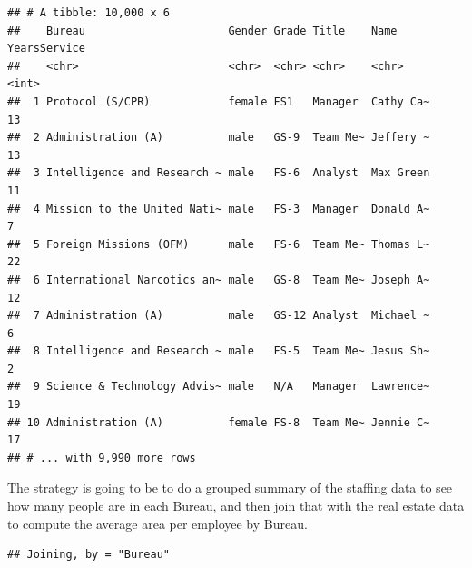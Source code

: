 \documentclass[12pt,letterpaperpaper,openany]{book}
\newenvironment{Shaded}{\begin{snugshade}}{\end{snugshade}}
\newcommand{\DataTypeTok}[1]{\textcolor[rgb]{0.13,0.29,0.53}{#1}}
\newcommand{\KeywordTok}[1]{\textcolor[rgb]{0.13,0.29,0.53}{\textbf{#1}}}
\newcommand{\NormalTok}[1]{#1}
\newcommand{\OperatorTok}[1]{\textcolor[rgb]{0.81,0.36,0.00}{\textbf{#1}}}
\newcommand{\StringTok}[1]{\textcolor[rgb]{0.31,0.60,0.02}{#1}}
\begin{document}
\begin{verbatim}
## # A tibble: 10,000 x 6
##    Bureau                      Gender Grade Title    Name      YearsService
##    <chr>                       <chr>  <chr> <chr>    <chr>            <int>
##  1 Protocol (S/CPR)            female FS1   Manager  Cathy Ca~           13
##  2 Administration (A)          male   GS-9  Team Me~ Jeffery ~           13
##  3 Intelligence and Research ~ male   FS-6  Analyst  Max Green           11
##  4 Mission to the United Nati~ male   FS-3  Manager  Donald A~            7
##  5 Foreign Missions (OFM)      male   FS-6  Team Me~ Thomas L~           22
##  6 International Narcotics an~ male   GS-8  Team Me~ Joseph A~           12
##  7 Administration (A)          male   GS-12 Analyst  Michael ~            6
##  8 Intelligence and Research ~ male   FS-5  Team Me~ Jesus Sh~            2
##  9 Science & Technology Advis~ male   N/A   Manager  Lawrence~           19
## 10 Administration (A)          female FS-8  Team Me~ Jennie C~           17
## # ... with 9,990 more rows
\end{verbatim}

The strategy is going to be to do a grouped summary of the staffing data to see how
many people are in each Bureau, and then join that with the real estate data to
compute the average area per employee by Bureau.

\begin{Shaded}
\end{Shaded}

\begin{verbatim}
## Joining, by = "Bureau"
\end{verbatim}
\end{document}
